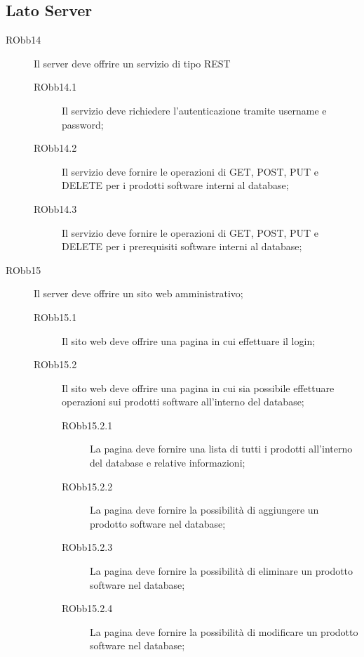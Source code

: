 \documentclass[../RelazioneFinale]{subfiles}
\begin{document}
			\subsection{Lato Server}
			\begin{description}
				\item[RObb14] Il server deve offrire un servizio di tipo REST
				\begin{description}
					\item[RObb14.1] Il servizio deve richiedere l'autenticazione tramite username e password;
					\item[RObb14.2] Il servizio deve fornire le operazioni di GET, POST, PUT e DELETE per i prodotti software interni al database;
					\item[RObb14.3] Il servizio deve fornire le operazioni di GET, POST, PUT e DELETE per i prerequisiti software interni al database;
				\end{description}
				
				\item[RObb15] Il server deve offrire un sito web amministrativo;
				\begin{description}
					\item[RObb15.1] Il sito web deve offrire una pagina in cui effettuare il login;
					
					\item[RObb15.2] Il sito web deve offrire una pagina in cui sia possibile effettuare operazioni sui prodotti software all'interno del database;
					\begin{description}
						\item[RObb15.2.1] La pagina deve fornire una lista di tutti i prodotti all'interno del database e relative informazioni;
						\item[RObb15.2.2] La pagina deve fornire la possibilità di aggiungere un prodotto software nel database;
						\item[RObb15.2.3] La pagina deve fornire la possibilità di eliminare un prodotto software nel database;
						\item[RObb15.2.4] La pagina deve fornire la possibilità di modificare un prodotto software nel database;
					\end{description}
					

\end{description}
\end{description}
\end{document}
